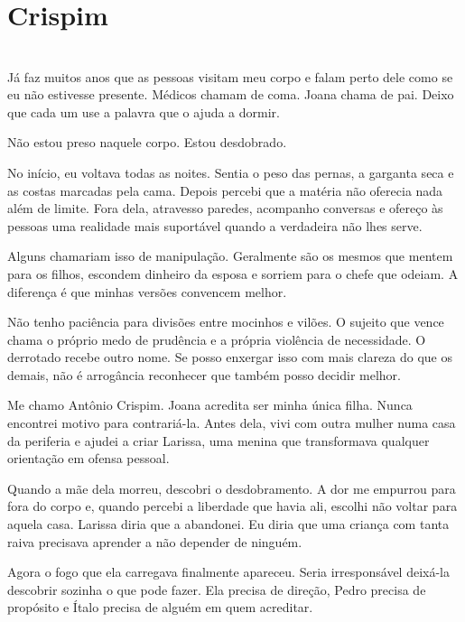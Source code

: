 \newpage

\ifdefined\useChapters
\chapter{Crispim}
\else
\chapter{}
\fi

Já faz muitos anos que as pessoas visitam meu corpo e falam perto dele como se eu não estivesse presente. Médicos chamam de coma. Joana chama de pai. Deixo que cada um use a palavra que o ajuda a dormir.

Não estou preso naquele corpo. Estou desdobrado.

No início, eu voltava todas as noites. Sentia o peso das pernas, a garganta seca e as costas marcadas pela cama. Depois percebi que a matéria não oferecia nada além de limite. Fora dela, atravesso paredes, acompanho conversas e ofereço às pessoas uma realidade mais suportável quando a verdadeira não lhes serve.

Alguns chamariam isso de manipulação. Geralmente são os mesmos que mentem para os filhos, escondem dinheiro da esposa e sorriem para o chefe que odeiam. A diferença é que minhas versões convencem melhor.

Não tenho paciência para divisões entre mocinhos e vilões. O sujeito que vence chama o próprio medo de prudência e a própria violência de necessidade. O derrotado recebe outro nome. Se posso enxergar isso com mais clareza do que os demais, não é arrogância reconhecer que também posso decidir melhor.

Me chamo Antônio Crispim. Joana acredita ser minha única filha. Nunca encontrei motivo para contrariá-la. Antes dela, vivi com outra mulher numa casa da periferia e ajudei a criar Larissa, uma menina que transformava qualquer orientação em ofensa pessoal.

Quando a mãe dela morreu, descobri o desdobramento. A dor me empurrou para fora do corpo e, quando percebi a liberdade que havia ali, escolhi não voltar para aquela casa. Larissa diria que a abandonei. Eu diria que uma criança com tanta raiva precisava aprender a não depender de ninguém.

Agora o fogo que ela carregava finalmente apareceu. Seria irresponsável deixá-la descobrir sozinha o que pode fazer. Ela precisa de direção, Pedro precisa de propósito e Ítalo precisa de alguém em quem acreditar.

